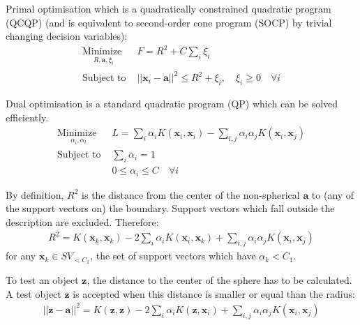 \documentclass[3p,times]{elsarticle}
\begin{document}
Primal optimisation which is a quadratically constrained quadratic program (QCQP) (and is equivalent to second-order cone program (SOCP) by trivial changing decision variables):
\begin{subequations}\label{eq:svdd_primal}
\begin{align}
\underset{
	\begin{array}{c}
		 R, \mathbf{a}, \xi_i
	\end{array}}{\text{Minimize }} & F = R^2 + C \sum_i \xi_i \\
\text{Subject to } & \left|\left| \mathbf{x}_i - \mathbf{a} \right|\right|^2 \le R^2 + \xi_i, \quad \xi_i \ge 0 \quad \forall i
\end{align}
\end{subequations}

Dual optimisation is a standard quadratic program (QP) which can be solved efficiently.
\begin{subequations}\label{eq:svdd_dual}
\begin{align}
\underset{
	\begin{array}{c}
		 \alpha_i, \alpha_l
	\end{array}}{\text{Minimize }} & L = \sum_i \alpha_i K \left( \mathbf{x}_i, \mathbf{x}_i \right) - \sum_{i,j} \alpha_i \alpha_j K \left( \mathbf{x}_i, \mathbf{x}_j \right)\\
\text{Subject to } & \sum_i \alpha_i = 1 \\
& 0 \le \alpha_i \le C \quad \forall i
\end{align}
\end{subequations}

By definition, $R^2$ is the distance from the center of the non-spherical $\mathbf{a}$ to (any of the support vectors on) the boundary. Support vectors which fall outside the description are excluded. Therefore:
\begin{align}
R^2 = K \left( \mathbf{x}_k, \mathbf{x}_k \right) - 2 \sum_i \alpha_i K \left( \mathbf{x}_i, \mathbf{x}_k \right) + \sum_{i,j} \alpha_i \alpha_j K \left( \mathbf{x}_i, \mathbf{x}_j \right)
\end{align}
for any $\mathbf{x}_k \in SV_{<C_1}$, the set of support vectors which have $\alpha_k < C_1$.

To test an object $\mathbf{z}$, the distance to the center of the sphere has to be calculated. A test
object $\mathbf{z}$ is accepted when this distance is smaller or equal than the radius:
\begin{align}
\left|\left| \mathbf{z} - \mathbf{a} \right|\right|^2 = K \left( \mathbf{z}, \mathbf{z} \right) - 2 \sum_i \alpha_i K \left( \mathbf{z}, \mathbf{x}_i \right) + \sum_{i,j} \alpha_i \alpha_j K \left( \mathbf{x}_i, \mathbf{x}_j \right)
\end{align}
\end{document}
